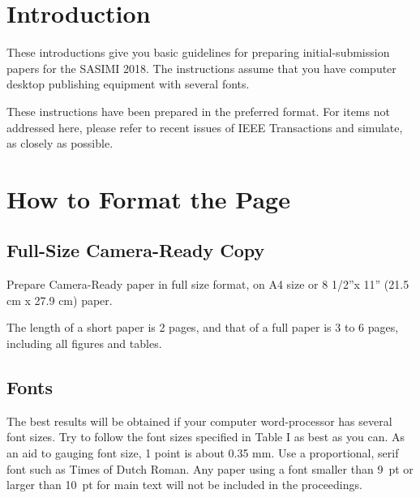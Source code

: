 \documentclass[twocolumn]{article}
\begin{document}
\section{Introduction}
						    
These introductions give you basic guidelines for
preparing initial-submission papers for the SASIMI 2018.
The instructions assume that you have computer desktop publishing equipment with several fonts. 

These instructions have been prepared in the preferred format. 
For items not addressed here, please refer to recent issues of IEEE Transactions and simulate,
as closely as possible.

\section{How to Format the Page}

\subsection{Full-Size Camera-Ready Copy}

Prepare Camera-Ready paper in full size format, on A4 size or 8 1/2''x 11'' (21.5 cm x 27.9 cm) paper.

The length of a short paper is 2 pages, and that of a full paper is 3 to 6 pages, including all figures and tables.


\subsection{Fonts}

The best results will be obtained if your computer word-processor has several font sizes. 
Try to follow the font sizes specified in Table I as best as you can. 
As an aid to gauging font size, 1 point is about 0.35 mm. 
Use a proportional, serif font such as Times of Dutch Roman. 
Any paper using a font smaller than 9~pt or larger than 10~pt for main text will not be included in the proceedings.
\end{document}
